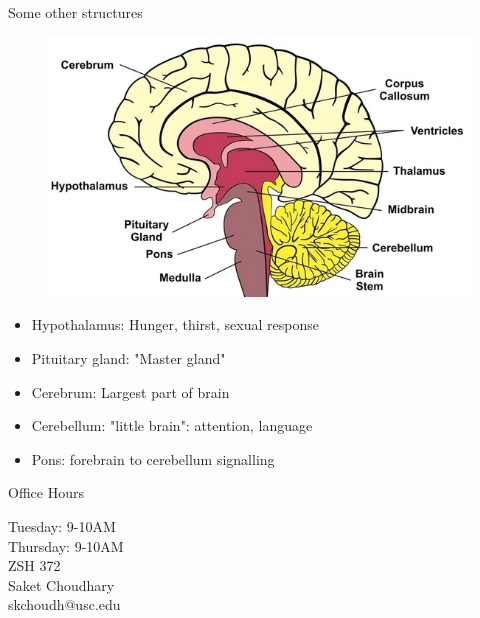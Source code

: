 \documentclass[10pt]{beamer}
\begin{document}
\begin{frame}[fragile]{Some other structures}
\begin{figure}
\includegraphics[width=0.5\linewidth]{deeper.jpg}
\end{figure}
\begin{itemize}[<+-| alert@+>]
\item Hypothalamus: Hunger, thirst, sexual response
\item Pituitary gland: "Master gland"
\item Cerebrum: Largest part of brain
\item Cerebellum: "little brain": attention, language
\item Pons: forebrain to cerebellum signalling
\end{itemize}
\end{frame}




\begin{frame}[fragile]{Office Hours}
\Large \begin{center}Tuesday: 9-10AM\\
Thursday: 9-10AM\\
ZSH 372\\
\vspace*{2cm}
Saket Choudhary\\ 
skchoudh@usc.edu\\
\end{center}


\end{frame}
\end{document}
